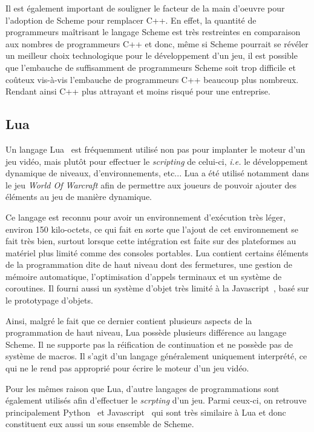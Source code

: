 \documentclass[12pt,oneside,letterpaper,francais]{book}
\newcommand{\ie}{{\textit{i.e. }}}
\begin{document}
Il est également important de souligner le facteur de la main d'oeuvre
pour l'adoption de Scheme pour remplacer C++. En effet, la quantité de
programmeurs maîtrisant le langage Scheme est très restreintes en
comparaison aux nombres de programmeurs C++ et donc, même si Scheme
pourrait se révéler un meilleur choix technologique pour le
développement d'un jeu, il est possible que l'embauche de suffisamment
de programmeurs Scheme soit trop difficile et coûteux vis-à-vis
l'embauche de programmeurs C++ beaucoup plus nombreux. Rendant ainsi
C++ plus attrayant et moins risqué pour une entreprise.


\subsection{Lua}

Un langage Lua~\cite{Lua} est fréquemment utilisé non pas pour
implanter le moteur d'un jeu vidéo, mais plutôt pour effectuer le
\textit{scripting} de celui-ci, \ie le développement dynamique de
niveaux, d'environnements, etc... Lua a été utilisé notamment dans le
jeu \textit{World Of Warcraft} afin de permettre aux joueurs de
pouvoir ajouter des éléments au jeu de manière dynamique.

Ce langage est reconnu pour avoir un environnement d'exécution très
léger, environ 150 kilo-octets, ce qui fait en sorte que l'ajout de
cet environnement se fait très bien, surtout lorsque cette intégration
est faite sur des plateformes au matériel plus limité comme des
consoles portables. Lua contient certains éléments de la programmation
dite de haut niveau dont des fermetures, une gestion de mémoire
automatique, l'optimisation d'appels terminaux et un système de
coroutines. Il fourni aussi un système d'objet très limité à la
Javascript~\cite{ECMA-262}, basé sur le prototypage d'objets.

Ainsi, malgré le fait que ce dernier contient plusieurs aspects de la
programmation de haut niveau, Lua possède plusieurs différence au
langage Scheme. Il ne supporte pas la réification de continuation et
ne possède pas de système de macros. Il s'agit d'un langage
généralement uniquement interprété, ce qui ne le rend pas approprié
pour écrire le moteur d'un jeu vidéo.

Pour les mêmes raison que Lua, d'autre langages de programmations sont
également utilisés afin d'effectuer le \textit{scrpting} d'un
jeu. Parmi ceux-ci, on retrouve principalement Python~\cite{Python} et
Javascript~\cite{ECMA-262} qui sont très similaire à Lua et donc
constituent eux aussi un sous ensemble de Scheme.
\end{document}
